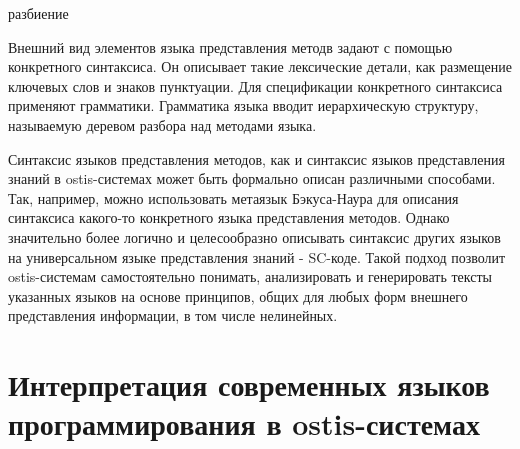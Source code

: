 \begin{SCn}
\begin{scnrelfromset}{разбиение}
    \begin{scnindent}
    \end{scnindent}
    \begin{scnindent}
    \end{scnindent}
\end{scnrelfromset}
\end{SCn}

Внешний вид элементов языка представления методв задают с помощью конкретного синтаксиса. Он описывает такие лексические
детали, как размещение ключевых слов и знаков пунктуации. Для спецификации конкретного синтаксиса применяют грамматики.
Грамматика языка вводит иерархическую структуру, называемую деревом разбора над методами языка.

Синтаксис языков представления методов, как и синтаксис языков представления знаний в ostis-системах может быть
формально описан различными способами. Так, например, можно использовать метаязык Бэкуса-Наура для описания синтаксиса
какого-то конкретного языка представления методов. Однако значительно более логично и целесообразно описывать синтаксис
других языков на универсальном языке представления знаний - SC-коде. Такой подход позволит ostis-системам самостоятельно
понимать, анализировать и генерировать тексты указанных языков на основе принципов, общих для любых форм внешнего
представления информации, в том числе нелинейных.


\section{Интерпретация современных языков программирования в ostis-системах}

%
